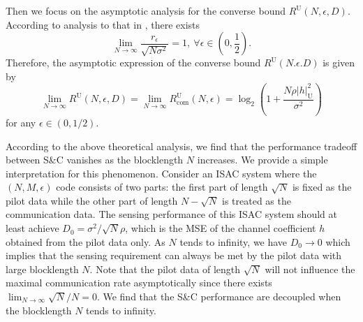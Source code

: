 \documentclass[conference,a4paper]{IEEEtran}
\begin{document}
Then we focus on the asymptotic analysis for the converse bound $R^\mathrm{U}(N,\epsilon,D)$. According to analysis to that in \cite{FozMcLSch:J03}, there exists
\begin{equation}
    \lim_{N\to \infty}\frac{r_\epsilon}{\sqrt{N\sigma^2}} = 1,\ \forall \epsilon \in (0,\frac{1}{2}).
\end{equation}
Therefore, the asymptotic expression of the converse bound $R^\mathrm{U}(N.\epsilon.D)$ is given by
\begin{equation}
    \lim_{N\to \infty}R^\mathrm{U}(N,\epsilon,D) = \lim_{N\to \infty}R^\mathrm{U}_\mathrm{com}(N,\epsilon) =\log_2(1+\frac{N\rho|h|_\mathrm{U}^2}{\sigma^2})
\end{equation}
for any $\epsilon\in(0,1/2)$.

According to the above theoretical analysis, we find that the performance tradeoff between  S\&C vanishes as the blocklength $N$ increases. We provide a simple interpretation for this phenomenon. Consider an ISAC system where the $(N,M,\epsilon)$ code consists of two parts: the first part of length $\sqrt{N}$ is fixed as the pilot data while the other part of length $N-\sqrt{N}$ is treated as the communication data. The sensing performance of this ISAC system should at least achieve $D_0 = \sigma^2/\sqrt{N}\rho$, which is the MSE of the channel coefficient $h$ obtained from the pilot data only. As $N$ tends to infinity, we have $D_0\to 0$ which implies that the sensing requirement can always be met by the pilot data with large blocklength $N$. Note that the pilot data of length $\sqrt{N}$ will not influence the maximal communication rate asymptotically since there exists $\lim_{N\to\infty} \sqrt{N}/N = 0$. We find that the S\&C performance are decoupled when the blocklength $N$ tends to infinity.
\end{document}
